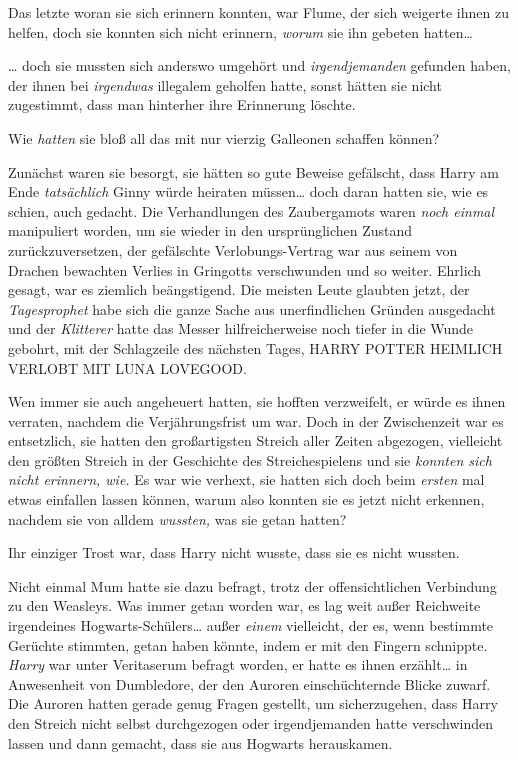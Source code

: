 {Das letzte woran sie sich erinnern konnten, war Flume, der sich weigerte ihnen zu helfen, doch sie konnten sich nicht erinnern, \emph{worum} sie ihn gebeten hatten…

… doch sie mussten sich anderswo umgehört und \emph{irgendjemanden} gefunden haben, der ihnen bei \emph{irgendwas} illegalem geholfen hatte, sonst hätten sie nicht zugestimmt, dass man hinterher ihre Erinnerung löschte.

Wie \emph{hatten} sie bloß all das mit nur vierzig Galleonen schaffen können?

Zunächst waren sie besorgt, sie hätten so gute Beweise gefälscht, dass Harry am Ende \emph{tatsächlich} Ginny würde heiraten müssen… doch daran hatten sie, wie es schien, auch gedacht. Die Verhandlungen des Zaubergamots waren \emph{noch einmal} manipuliert worden, um sie wieder in den ursprünglichen Zustand zurückzuversetzen, der gefälschte Verlobungs-Vertrag war aus seinem von Drachen bewachten Verlies in Gringotts verschwunden und so weiter. Ehrlich gesagt, war es ziemlich beängstigend. Die meisten Leute glaubten jetzt, der \emph{Tagesprophet} habe sich die ganze Sache aus unerfindlichen Gründen ausgedacht und der \emph{Klitterer} hatte das Messer hilfreicherweise noch tiefer in die Wunde gebohrt, mit der Schlagzeile des nächsten Tages, HARRY POTTER HEIMLICH VERLOBT MIT LUNA LOVEGOOD.

Wen immer sie auch angeheuert hatten, sie hofften verzweifelt, er würde es ihnen verraten, nachdem die Verjährungsfrist um war. Doch in der Zwischenzeit war es entsetzlich, sie hatten den großartigsten Streich aller Zeiten abgezogen, vielleicht den größten Streich in der Geschichte des Streichespielens und sie \emph{konnten sich nicht erinnern, wie.} Es war wie verhext, sie hatten sich doch beim \emph{ersten} mal etwas einfallen lassen können, warum also konnten sie es jetzt nicht erkennen, nachdem sie von alldem \emph{wussten,} was sie getan hatten?

Ihr einziger Trost war, dass Harry nicht wusste, dass sie es nicht wussten.

Nicht einmal Mum hatte sie dazu befragt, trotz der offensichtlichen Verbindung zu den Weasleys. Was immer getan worden war, es lag weit außer Reichweite irgendeines Hogwarts-Schülers… außer \emph{einem} vielleicht, der es, wenn bestimmte Gerüchte stimmten, getan haben könnte, indem er mit den Fingern schnippte. \emph{Harry} war unter Veritaserum befragt worden, er hatte es ihnen erzählt… in Anwesenheit von Dumbledore, der den Auroren einschüchternde Blicke zuwarf. Die Auroren hatten gerade genug Fragen gestellt, um sicherzugehen, dass Harry den Streich nicht selbst durchgezogen oder irgendjemanden hatte verschwinden lassen und dann gemacht, dass sie aus Hogwarts herauskamen.

}
